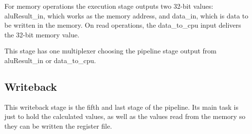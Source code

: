 For memory operations the execution stage outputs two 32-bit values: aluResult\_in, which works as the memory address, and data\_in, which is data to be written in the memory. 
On read operations, the data\_to\_cpu input delivers the 32-bit memory value.

This stage has one multiplexer choosing the pipeline stage output from aluResult\_in or data\_to\_cpu.
\subsection{Writeback}
This writeback stage is the fifth and last stage of the pipeline. Its main task is just to hold the calculated values, as well as the values read from the memory 
so they can be written the register file.
